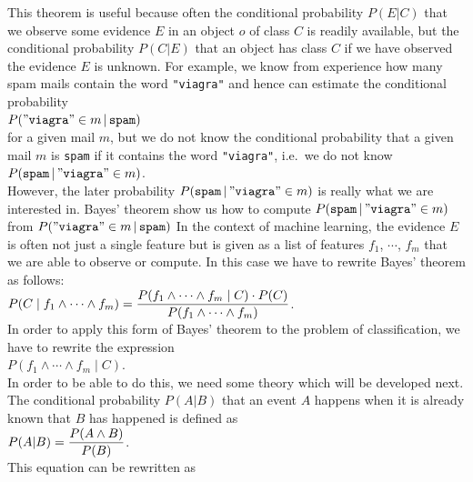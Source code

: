 This theorem is useful because often the conditional probability $P(E|C)$ that we observe some evidence $E$ in an object
$o$ of class $C$ is readily available, but the conditional probability $P(C|E)$ that an object has class $C$ if
we have observed the evidence $E$ is unknown.  For example, we know from experience how many spam mails contain
the word \texttt{"viagra"} and hence can estimate the conditional probability
\\[0.2cm]
\hspace*{1.3cm}
$P(\mathtt{"viagra"} \in m\,|\,\mathtt{spam})$
\\[0.2cm]
for a given mail $m$, 
but we do not know the conditional probability that a given mail $m$ is \texttt{spam} if it contains the word
\texttt{"viagra"}, i.e.~we do not know
\\[0.2cm]
\hspace*{1.3cm}
$P(\mathtt{spam}\,|\,\mathtt{"viagra"}\in m)$.
\\[0.2cm]
However, the later probability $P(\mathtt{spam}\,|\,\mathtt{"viagra"}\in m)$ is really what we are interested in.
Bayes' theorem show us how to compute $P(\mathtt{spam}\,|\,\mathtt{"viagra"}\in m)$ from $P(\mathtt{"viagra"} \in m\,|\,\mathtt{spam})$
In the context of machine learning, the evidence $E$ is often not just a single feature but is 
given as a list of features $f_1$, $\cdots$, $f_m$ that we are able to observe or compute.  In this case we
have to rewrite Bayes' theorem as follows:
\\[0.2cm]
\hspace*{1.3cm}
$\displaystyle P(C\;|\;f_1 \wedge \cdots \wedge f_m) = \frac{P(f_1 \wedge \cdots \wedge f_m\;|\;C) \cdot P(C)}{P(f_1 \wedge \cdots \wedge f_m)}$.
\\[0.2cm]
In order to apply this form of Bayes' theorem to the problem of classification, we have to rewrite the expression
\\[0.2cm]
\hspace*{1.3cm}
$P(f_1 \wedge \cdots \wedge f_m\;|\;C)$.
\\[0.2cm]
In order to be able to do this, we need some theory which will be developed next.  The conditional probability
$P(A|B)$ that an event $A$ happens when it is already known that $B$ has happened is defined as 
\\[0.2cm]
\hspace*{1.3cm}
$\displaystyle P(A|B) = \frac{P(A \wedge B)}{P(B)}$.
\\[0.2cm]
This equation can be rewritten as
\\[0.2cm]
\hspace*{1.3cm}
